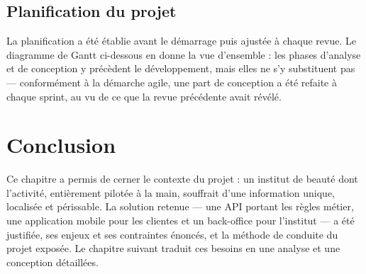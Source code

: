 \subsection{Planification du projet}

La planification a été établie avant le démarrage puis ajustée à chaque revue.
Le diagramme de Gantt ci-dessous en donne la vue d'ensemble : les phases
d'analyse et de conception y précèdent le développement, mais elles ne s'y
substituent pas --- conformément à la démarche agile, une part de conception a
été refaite à chaque sprint, au vu de ce que la revue précédente avait révélé.


\section*{Conclusion}

Ce chapitre a permis de cerner le contexte du projet : un institut de beauté
dont l'activité, entièrement pilotée à la main, souffrait d'une information
unique, localisée et périssable. La solution retenue --- une API portant les
règles métier, une application mobile pour les clientes et un back-office pour
l'institut --- a été justifiée, ses enjeux et ses contraintes énoncés, et la
méthode de conduite du projet exposée. Le chapitre suivant traduit ces besoins
en une analyse et une conception détaillées.

